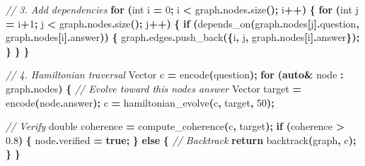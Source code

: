 \documentclass[
  11pt,
  a4paper,
]{article}
\newenvironment{Shaded}{\begin{snugshade}}{\end{snugshade}}
\newcommand{\CommentTok}[1]{\textcolor[rgb]{0.56,0.35,0.01}{\textit{#1}}}
\newcommand{\ControlFlowTok}[1]{\textcolor[rgb]{0.13,0.29,0.53}{\textbf{#1}}}
\newcommand{\DataTypeTok}[1]{\textcolor[rgb]{0.13,0.29,0.53}{#1}}
\newcommand{\DecValTok}[1]{\textcolor[rgb]{0.00,0.00,0.81}{#1}}
\newcommand{\FloatTok}[1]{\textcolor[rgb]{0.00,0.00,0.81}{#1}}
\newcommand{\KeywordTok}[1]{\textcolor[rgb]{0.13,0.29,0.53}{\textbf{#1}}}
\newcommand{\NormalTok}[1]{#1}
\newcommand{\OperatorTok}[1]{\textcolor[rgb]{0.81,0.36,0.00}{\textbf{#1}}}
\begin{document}
\begin{Shaded}
\begin{Highlighting}[]
        \CommentTok{// 3. Add dependencies}
        \ControlFlowTok{for} \OperatorTok{(}\DataTypeTok{int}\NormalTok{ i }\OperatorTok{=} \DecValTok{0}\OperatorTok{;}\NormalTok{ i }\OperatorTok{\textless{}}\NormalTok{ graph}\OperatorTok{.}\NormalTok{nodes}\OperatorTok{.}\NormalTok{size}\OperatorTok{();}\NormalTok{ i}\OperatorTok{++)} \OperatorTok{\{}
            \ControlFlowTok{for} \OperatorTok{(}\DataTypeTok{int}\NormalTok{ j }\OperatorTok{=}\NormalTok{ i}\OperatorTok{+}\DecValTok{1}\OperatorTok{;}\NormalTok{ j }\OperatorTok{\textless{}}\NormalTok{ graph}\OperatorTok{.}\NormalTok{nodes}\OperatorTok{.}\NormalTok{size}\OperatorTok{();}\NormalTok{ j}\OperatorTok{++)} \OperatorTok{\{}
                \ControlFlowTok{if} \OperatorTok{(}\NormalTok{depends\_on}\OperatorTok{(}\NormalTok{graph}\OperatorTok{.}\NormalTok{nodes}\OperatorTok{[}\NormalTok{j}\OperatorTok{].}\NormalTok{question}\OperatorTok{,}\NormalTok{ graph}\OperatorTok{.}\NormalTok{nodes}\OperatorTok{[}\NormalTok{i}\OperatorTok{].}\NormalTok{answer}\OperatorTok{))} \OperatorTok{\{}
\NormalTok{                    graph}\OperatorTok{.}\NormalTok{edges}\OperatorTok{.}\NormalTok{push\_back}\OperatorTok{(\{}\NormalTok{i}\OperatorTok{,}\NormalTok{ j}\OperatorTok{,}\NormalTok{ graph}\OperatorTok{.}\NormalTok{nodes}\OperatorTok{[}\NormalTok{i}\OperatorTok{].}\NormalTok{answer}\OperatorTok{\});}
                \OperatorTok{\}}
            \OperatorTok{\}}
        \OperatorTok{\}}
        
        \CommentTok{// 4. Hamiltonian traversal}
\NormalTok{        Vector c }\OperatorTok{=}\NormalTok{ encode}\OperatorTok{(}\NormalTok{question}\OperatorTok{);}
        \ControlFlowTok{for} \OperatorTok{(}\KeywordTok{auto}\OperatorTok{\&}\NormalTok{ node }\OperatorTok{:}\NormalTok{ graph}\OperatorTok{.}\NormalTok{nodes}\OperatorTok{)} \OperatorTok{\{}
            \CommentTok{// Evolve toward this node\textquotesingle{}s answer}
\NormalTok{            Vector target }\OperatorTok{=}\NormalTok{ encode}\OperatorTok{(}\NormalTok{node}\OperatorTok{.}\NormalTok{answer}\OperatorTok{);}
\NormalTok{            c }\OperatorTok{=}\NormalTok{ hamiltonian\_evolve}\OperatorTok{(}\NormalTok{c}\OperatorTok{,}\NormalTok{ target}\OperatorTok{,} \DecValTok{50}\OperatorTok{);}
            
            \CommentTok{// Verify}
            \DataTypeTok{double}\NormalTok{ coherence }\OperatorTok{=}\NormalTok{ compute\_coherence}\OperatorTok{(}\NormalTok{c}\OperatorTok{,}\NormalTok{ target}\OperatorTok{);}
            \ControlFlowTok{if} \OperatorTok{(}\NormalTok{coherence }\OperatorTok{\textgreater{}} \FloatTok{0.8}\OperatorTok{)} \OperatorTok{\{}
\NormalTok{                node}\OperatorTok{.}\NormalTok{verified }\OperatorTok{=} \KeywordTok{true}\OperatorTok{;}
            \OperatorTok{\}} \ControlFlowTok{else} \OperatorTok{\{}
                \CommentTok{// Backtrack}
                \ControlFlowTok{return}\NormalTok{ backtrack}\OperatorTok{(}\NormalTok{graph}\OperatorTok{,}\NormalTok{ c}\OperatorTok{);}
            \OperatorTok{\}}
        \OperatorTok{\}}
        

\end{Highlighting}
\end{Shaded}
\end{document}
